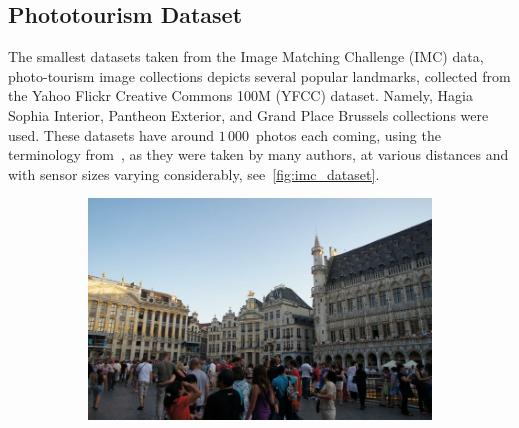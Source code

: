 \subsection{Phototourism Dataset}

The smallest datasets taken from the Image Matching Challenge (IMC) data, photo-tourism image
collections depicts several popular landmarks, collected from the Yahoo Flickr Creative
Commons 100M (YFCC) dataset. Namely, Hagia Sophia Interior, Pantheon Exterior, and Grand
Place Brussels collections were used. These datasets have around $1\,000$~photos each
coming, using the terminology from~\citet{NRIW},  as they were taken by
many authors, at various distances and with sensor sizes varying considerably,
see~\cref{fig:imc_dataset}.

\begin{figure}
	\centering
	\begin{subfigure}{.5\textwidth}
		\centering
		\includegraphics[width=.9\textwidth]{../graphics/grand_06498281_8296173847.jpg}
	\end{subfigure}%
	\begin{subfigure}{.5\textwidth}
		\centering

\end{subfigure}
\end{figure}
